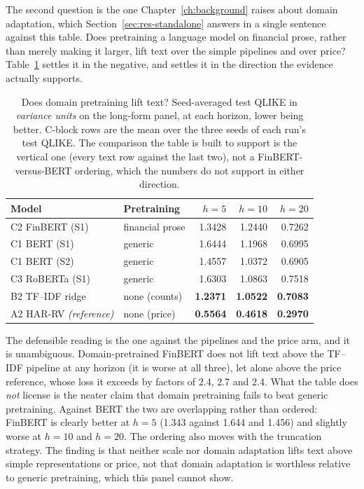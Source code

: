 The second question is the one Chapter~\ref{ch:background} raises about
domain adaptation, which Section~\ref{sec:res-standalone} answers in a
single sentence against this table. Does
pretraining a language model on financial prose, rather than merely
making it larger, lift text over the simple pipelines and over price?
Table~\ref{tab:app-domain} settles it in the negative, and settles it in
the direction the evidence actually supports.

\begin{table}[htbp]
\centering
\caption[Domain adaptation against the simple pipeline and the price
reference]{Does domain pretraining lift text? Seed-averaged test QLIKE in
\emph{variance units} on the long-form panel, at each horizon, lower being
better. C-block rows are the mean over the three seeds of each run's test
QLIKE. The comparison the table is built to support is the vertical one
(every text row against the last two), not a FinBERT-versus-BERT
ordering, which the numbers do not support in either direction.}
\label{tab:app-domain}
\singlespacing\small
\setlength{\tabcolsep}{5pt}
\begin{tabular}{@{}llrrr@{}}
\toprule
Model & Pretraining & $h{=}5$ & $h{=}10$ & $h{=}20$ \\
\midrule
C2 FinBERT (S1) & financial prose & 1.3428 & 1.2440 & 0.7262 \\
C1 BERT (S1)    & generic         & 1.6444 & 1.1968 & 0.6995 \\
C1 BERT (S2)    & generic         & 1.4557 & 1.0372 & 0.6905 \\
C3 RoBERTa (S1) & generic         & 1.6303 & 1.0863 & 0.7518 \\
\midrule
B2 TF--IDF ridge & none (counts)  & \textbf{1.2371} & \textbf{1.0522} & \textbf{0.7083} \\
A2 HAR-RV \emph{(reference)} & none (price) & \textbf{0.5564} & \textbf{0.4618} & \textbf{0.2970} \\
\bottomrule
\end{tabular}
\end{table}

The defensible reading is the one against the pipelines and the price arm,
and it is unambiguous. Domain-pretrained FinBERT does not lift text above
the TF--IDF pipeline at any horizon (it is worse at all three), let
alone above the price reference, whose loss it exceeds by factors of 2.4,
2.7 and 2.4. What the table does \emph{not} license is the neater claim
that domain pretraining fails to beat generic pretraining. Against BERT the
two are overlapping rather than ordered: FinBERT is clearly better at
$h{=}5$ (1.343 against 1.644 and 1.456) and slightly worse at $h{=}10$ and
$h{=}20$. The ordering also moves with the truncation strategy. The
finding is that neither scale nor domain adaptation lifts text above simple
representations or price, not that domain adaptation is worthless
relative to generic pretraining, which this panel cannot show.


